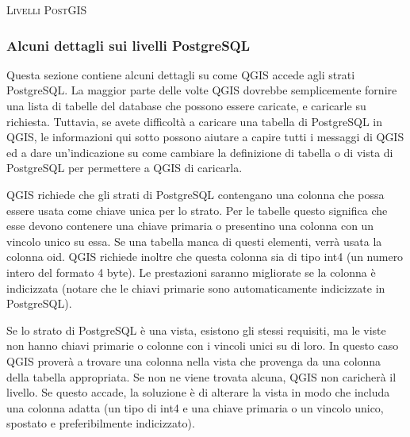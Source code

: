 \begin{Tip}\caption{\textsc{Livelli PostGIS}}
\end{Tip}

\subsubsection{Alcuni dettagli sui livelli PostgreSQL}\label{sec:postgis_details}

Questa sezione contiene alcuni dettagli su come QGIS accede agli strati
PostgreSQL. La maggior parte delle volte QGIS dovrebbe semplicemente fornire
una lista di tabelle del database che possono essere caricate, e caricarle su
richiesta. Tuttavia, se avete difficoltà a caricare una tabella di PostgreSQL
in QGIS, le informazioni qui sotto possono aiutare a capire tutti i messaggi di QGIS ed a
dare un'indicazione su come cambiare la definizione di tabella o di vista di PostgreSQL per permettere
a QGIS di caricarla.

QGIS richiede che gli strati di PostgreSQL contengano una colonna che possa essere usata come
chiave unica per lo strato. Per le tabelle questo significa che esse devono
contenere una chiave primaria o presentino una colonna con un vincolo unico su
essa. Se una tabella manca di questi
elementi, verrà usata la colonna oid. QGIS richiede inoltre che questa colonna sia di
tipo int4 (un numero intero del formato 4 byte). Le prestazioni saranno migliorate se la colonna è
indicizzata (notare che le chiavi primarie sono automaticamente indicizzate in PostgreSQL).

Se lo strato di PostgreSQL è una vista, esistono gli stessi requisiti, ma le
viste non hanno chiavi primarie o colonne con i vincoli unici su di loro. In
questo caso QGIS proverà a trovare una colonna nella vista che provenga da una
colonna della tabella appropriata. Se non ne viene trovata alcuna, QGIS non
caricherà il livello. Se questo accade, la soluzione è di alterare la vista in
modo che includa una colonna adatta (un tipo di int4 e una chiave primaria o un vincolo unico, spostato e preferibilmente indicizzato).

